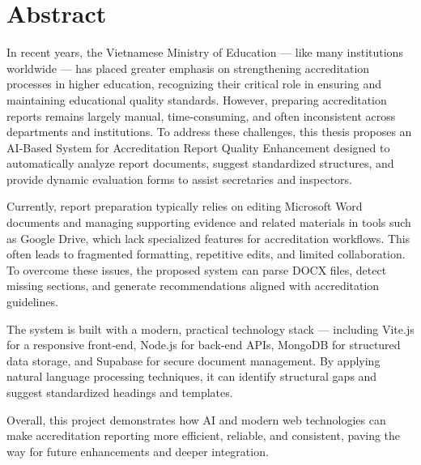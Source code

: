 \chapter*{Abstract}

\large
In recent years, the Vietnamese Ministry of Education — like many institutions worldwide — has placed greater emphasis on strengthening accreditation processes in higher education, recognizing their critical role in ensuring and maintaining educational quality standards. However, preparing accreditation reports remains largely manual, time‑consuming, and often inconsistent across departments and institutions. To address these challenges, this thesis proposes an AI‑Based System for Accreditation Report Quality Enhancement designed to automatically analyze report documents, suggest standardized structures, and provide dynamic evaluation forms to assist secretaries and inspectors.

Currently, report preparation typically relies on editing Microsoft Word documents and managing supporting evidence and related materials in tools such as Google Drive, which lack specialized features for accreditation workflows. This often leads to fragmented formatting, repetitive edits, and limited collaboration. To overcome these issues, the proposed system can parse DOCX files, detect missing sections, and generate recommendations aligned with accreditation guidelines.

The system is built with a modern, practical technology stack — including Vite.js for a responsive front‑end, Node.js for back‑end APIs, MongoDB for structured data storage, and Supabase for secure document management. By applying natural language processing techniques, it can identify structural gaps and suggest standardized headings and templates.

Overall, this project demonstrates how AI and modern web technologies can make accreditation reporting more efficient, reliable, and consistent, paving the way for future enhancements and deeper integration.

